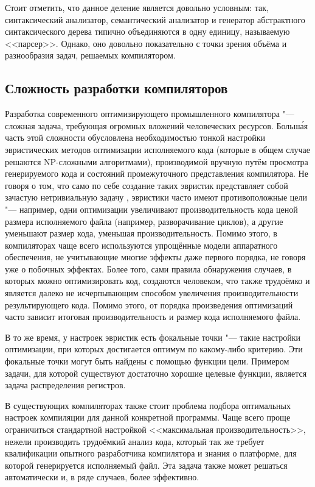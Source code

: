 Стоит отметить, что данное деление является довольно условным: так, синтаксический анализатор, семантический анализатор и генератор абстрактного синтаксического дерева типично объединяются в одну единицу, называемую <<парсер>>. Однако, оно довольно показательно с точки зрения объёма и разнообразия задач, решаемых компилятором.


\subsection{Сложность разработки компиляторов}
Разработка современного оптимизирующего промышленного компилятора "--- сложная задача, требующая огромных вложений человеческих ресурсов. Больш\'{а}я часть этой сложности обусловлена необходимостью тонкой настройки эвристических методов оптимизации исполняемого кода (которые в общем случае решаются NP-сложными алгоритмами), производимой вручную путём просмотра генерируемого кода и состояний промежуточного представления компилятора. Не говоря о том, что само по себе создание таких эвристик представляет собой зачастую нетривиальную задачу \cite{Muchnick:2004:EIS:989393.989413,Lavery:1995:IPC:626512.626987,Abraham:1996:MSR:243846.243903}, эвристики часто имеют противоположные цели "--- например, одни оптимизации увеличивают производительность кода ценой размера исполняемого файла (например, разворачивание циклов), а другие уменьшают размер кода, уменьшая производительность. Помимо этого, в компиляторах чаще всего используются упрощённые модели аппаратного обеспечения, не учитывающие многие эффекты даже первого порядка, не говоря уже о побочных эффектах. Более того, сами правила обнаружения случаев, в которых можно оптимизировать код, создаются человеком, что также трудоёмко и является далеко не исчерпывающим способом увеличения производительности результирующего кода. Помимо этого, от порядка произведения оптимизаций часто зависит итоговая производительность и размер кода исполняемого файла.

В то же время, у настроек эвристик есть фокальные точки "--- такие настройки оптимизации, при которых достигается оптимум по какому-либо критерию. Эти фокальные точки могут быть найдены с помощью функции цели. Примером задачи, для которой существуют достаточно хорошие целевые функции, является задача распределения регистров.

В существующих компиляторах также стоит проблема подбора оптимальных настроек компиляции для данной конкретной программы. Чаще всего проще ограничиться стандартной настройкой <<максимальная производительность>>, нежели производить трудоёмкий анализ кода, который так же требует квалификации опытного разработчика компилятора и знания о платформе, для которой генерируется исполняемый файл. Эта задача также может решаться автоматически и, в ряде случаев, более эффективно.


